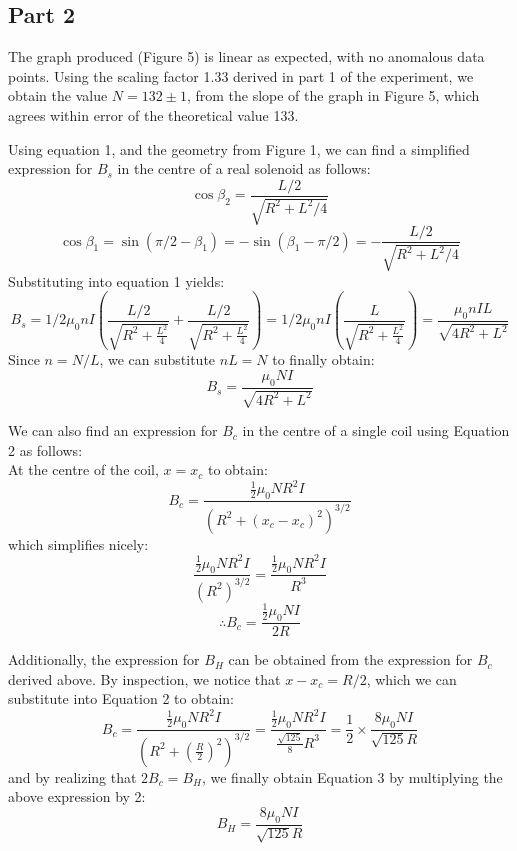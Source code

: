 \documentclass[letterpaper]{article}
\begin{document}
\subsection{Part 2}


The graph produced (Figure 5) is linear as expected, with no anomalous data points.
Using the scaling factor 1.33 derived in part 1 of the experiment, we obtain the value $N=132 \pm 1$,
from the slope of the graph in Figure 5, which agrees within error of the theoretical value 133.



Using equation 1, and the geometry from Figure 1, we can find a simplified expression for $B_s$ in the centre of a real solenoid as follows:
$$ \cos{\beta_2} = \frac{L/2}{\sqrt{R^2+L^2/4}}$$
$$ \cos{\beta_1} = \sin{(\pi/2 - \beta_1)} = -\sin{(\beta_1-\pi/2)} = -\frac{L/2}{\sqrt{R^2+L^2/4}}  $$
Substituting into equation 1 yields:
$$ B_s = 1/2 \mu_0nI \left(\frac{L/2}{\sqrt{R^2+\frac{L^2}{4}}} + \frac{L/2}{\sqrt{R^2+\frac{L^2}{4}}} \right) =  1/2\mu_0nI \left(\frac{L}{\sqrt{R^2+\frac{L^2}{4}}} \right)= \frac{\mu_0nIL}{\sqrt{4R^2+L^2}}$$
Since $n=N/L$, we can substitute $nL=N$ to finally obtain:
$$ B_s= \frac{\mu_0NI}{\sqrt{4R^2+L^2}} $$

We can also find an expression for $B_c$ in the centre of a single coil using Equation 2 as follows:\\
At the centre of the coil, $x=x_c$ to obtain:
$$ B_c = \frac{\frac{1}{2} \mu_0NR^2I}{(R^2+(x_c-x_c)^2)^{3/2}} $$
which simplifies nicely:
$$ \frac{\frac{1}{2} \mu_0NR^2I}{(R^2)^{3/2}} = \frac{\frac{1}{2} \mu_0NR^2I}{R^3}  $$
$$ \therefore B_c = \frac{\frac{1}{2} \mu_0NI}{2R} $$

Additionally, the expression for $B_H$ can be obtained from the expression for $B_c$ derived above. By inspection,
we notice that $x-x_c=R/2$, which we can substitute into Equation 2 to obtain:
$$ B_c= \frac{\frac{1}{2}\mu_0NR^2I}{(R^2+(\frac{R}{2})^2)^{3/2}} = \frac{\frac{1}{2}\mu_0NR^2I}{\frac{\sqrt{125}}{8}R^3} = \frac{1}{2}\times \frac{8\mu_0NI}{\sqrt{125}R} $$
and by realizing that $2B_c=B_H$, we finally obtain Equation 3 by multiplying the above expression by 2:
$$B_H=\frac{8\mu_0NI}{\sqrt{125}R}$$
\end{document}
